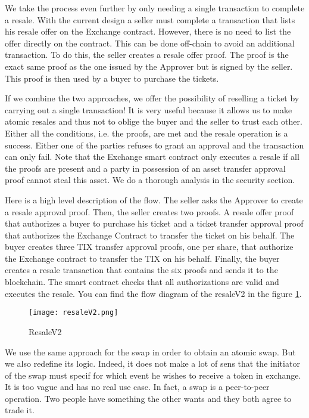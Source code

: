 \documentclass[a4paper,11pt,oneside]{report}
\begin{document}
We take the process even further by only needing a single transaction to complete a resale. With the current design a seller must complete a transaction that lists his resale offer on the Exchange contract. However, there is no need to list the offer directly on the contract. This can be done off-chain to avoid an additional transaction. To do this, the seller creates a resale offer proof. The proof is the exact same proof as the one issued by the Approver but is signed by the seller. This proof is then used by a buyer to purchase the tickets.

If we combine the two approaches, we offer the possibility of reselling a ticket by carrying out a single transaction! It is very useful because it allows us to make atomic resales and thus not to oblige the buyer and the seller to trust each other. Either all the conditions, i.e. the proofs, are met and the resale operation is a success. Either one of the parties refuses to grant an approval and the transaction can only fail. Note that the Exchange smart contract only executes a resale if all the proofs are present and a party in possession of an asset transfer approval proof cannot steal this asset. We do a thorough analysis in the security section.

Here is a high level description of the flow. The seller asks the Approver to create a resale approval proof. Then, the seller creates two proofs. A resale offer proof that authorizes a buyer to purchase his ticket and a ticket transfer approval proof that authorizes the Exchange Contract to transfer the ticket on his behalf. The buyer creates three TIX transfer approval proofs, one per share, that authorize the Exchange contract to transfer the TIX on his behalf. Finally, the buyer creates a resale transaction that contains the six proofs and sends it to the blockchain. The smart contract checks that all authorizations are valid and executes the resale. You can find the flow diagram of the resaleV2 in the figure
\hyperref[fig:resaleV2]{\ref{fig:resaleV2}}.

\begin{figure}[h!]
  \texttt{[image: resaleV2.png]}
  \caption{ResaleV2}
  \label{fig:resaleV2}
\end{figure}

We use the same approach for the swap in order to obtain an atomic swap. But we also redefine its logic. Indeed, it does not make a lot of sens that the initiator of the swap must specif for which event he wishes to receive a token in exchange. It is too vague and has no real use case. In fact, a swap is a peer-to-peer operation. Two people have something the other wants and they both agree to trade it. 
\end{document}
